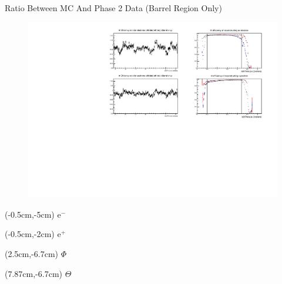 \documentclass[10pt]{beamer}
\begin{document}
\begin{frame}{Ratio Between MC And Phase 2 Data (Barrel Region Only)}
	\begin{figure}
		\centering
		\includegraphics[width=\textwidth]{Plots/Eff/BarrelRatio1.pdf}
	\end{figure}

		\begin{textblock*}{0.3\textwidth}(-0.5cm,-5cm)
	$\textrm{e}^-$
\end{textblock*}
\begin{textblock*}{0.3\textwidth}(-0.5cm,-2cm)
	$\textrm{e}^+$
\end{textblock*}


\begin{textblock*}{0.3\textwidth}(2.5cm,-6.7cm)
	$\Phi$
\end{textblock*}


\begin{textblock*}{0.3\textwidth}(7.87cm,-6.7cm)
	$\Theta$
\end{textblock*}




\end{frame}
\end{document}
